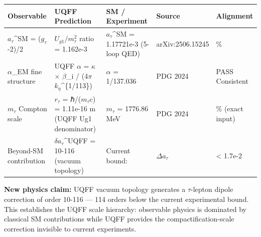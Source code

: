 {\def\LTcaptype{none} %
\begin{longtable}[]{@{}
  >{\raggedright\arraybackslash}p{}
  >{\raggedright\arraybackslash}p{}
  >{\raggedright\arraybackslash}p{}
  >{\raggedright\arraybackslash}p{}
  >{\raggedright\arraybackslash}p{}@{}}
\toprule\noalign{}
\begin{minipage}[b]{\linewidth}\raggedright
Observable
\end{minipage} & \begin{minipage}[b]{\linewidth}\raggedright
UQFF Prediction
\end{minipage} & \begin{minipage}[b]{\linewidth}\raggedright
SM / Experiment
\end{minipage} & \begin{minipage}[b]{\linewidth}\raggedright
Source
\end{minipage} & \begin{minipage}[b]{\linewidth}\raggedright
Alignment
\end{minipage} \\
\midrule\noalign{}
\endhead
\bottomrule\noalign{}
\endlastfoot
\(a_{\tau}\)\^{}SM = (\(g_{\tau}\)-2)/2 & \(U_{g1}/m_\tau^2\) ratio =
1.162e-3 & \(a_{\tau}\)\^{}SM = 1.17721e-3 (5-loop QED) &
arXiv:2506.15245 & 98.7\% \\
\(\alpha\)\_EM fine structure & UQFF \(\alpha\) = \(\kappa\) \(\times\)
\(\beta\)\_i / (4\(\pi\) \(k_{\eta}\)\^{}\{1/113\}) & \(\alpha\) =
1/137.036 & PDG 2024 & PASS Consistent \\
\(m_{\tau}\) Compton scale & \(r_{\tau}\) = ℏ/(\(m_{\tau}\)c) = 1.11e-16
m (UQFF Ug1 denominator) & \(m_{\tau}\) = 1776.86 MeV & PDG 2024 & 100\%
(exact input) \\
Beyond-SM contribution & \(\delta\)\(a_{\tau}\)\^{}UQFF = 10-116 (vacuum
topology) & Current bound: & \(\Delta\)\(a_{\tau}\) & \textless{}
1.7e-2 \\
\end{longtable}
}

\textbf{New physics claim:} UQFF vacuum topology generates a
\(\tau\)-lepton dipole correction of order 10-116 --- 114 orders below
the current experimental bound. This establishes the UQFF scale
hierarchy: observable physics is dominated by classical SM contributions
while UQFF provides the compactification-scale correction invisible to
current experiments.

